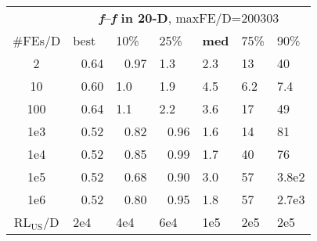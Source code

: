 \begin{tabular}{c|llllll}
 & \multicolumn{6}{|c}{\textbf{\textit{f}\raisebox{-0.35ex}{1}--\textit{f}\raisebox{-0.35ex}{24} in 20-D}, maxFE/D=200303}\\
\#FEs/D & best & 10\% & 25\% & \textbf{med} & 75\% & 90\%\\
2 & ~\,0.64 & ~\,0.97 & \hspace*{1ex}1.3 & \hspace*{1ex}2.3 & 13 & 40\\
10 & ~\,0.60 & \hspace*{1ex}1.0 & \hspace*{1ex}1.9 & \hspace*{1ex}4.5 & \hspace*{1ex}6.2 & \hspace*{1ex}7.4\\
100 & ~\,0.64 & \hspace*{1ex}1.1 & \hspace*{1ex}2.2 & \hspace*{1ex}3.6 & 17 & 49\\
1e3 & ~\,0.52 & ~\,0.82 & ~\,0.96 & \hspace*{1ex}1.6 & 14 & 81\\
1e4 & ~\,0.52 & ~\,0.85 & ~\,0.99 & \hspace*{1ex}1.7 & 40 & 76\\
1e5 & ~\,0.52 & ~\,0.68 & ~\,0.90 & \hspace*{1ex}3.0 & 57 & 3.8e2\\
1e6 & ~\,0.52 & ~\,0.80 & ~\,0.95 & \hspace*{1ex}1.8 & 57 & 2.7e3\\
$\text{RL}_{\text{US}}$/D & 2e4 & 4e4 & 6e4 & 1e5 & 2e5 & 2e5
\end{tabular}
